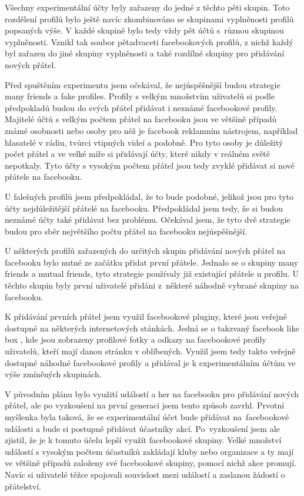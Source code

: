 \documentclass[thesis=M,czech]{FITthesis}[2013/05/10]
\begin{document}
Všechny experimentální účty byly zařazeny do jedné z těchto pěti skupin. Toto rozdělení profilů bylo ještě navíc zkombinováno se skupinami vyplněnosti profilů popsaných výše. V každé skupině bylo tedy vždy pět účtů s~různou skupinou vyplněnosti. Vznikl tak soubor pětadvaceti facebookových profilů, z nichž každý byl zařazen do jiné skupiny vyplněnosti a také rozdílné skupiny pro přidávání nových přátel.

Před spuštěním experimentu jsem očekával, že nejúspěšnější budou strategie many friends a fake profiles. Profily s velkým množstvím uživatelů si podle předpokladů budou do svých přátel přidávat i neznámé facebookové profily. Majitelé účtů s velkým počtem přátel na facebooku jsou ve většině případů známé osobnosti nebo osoby pro něž je facebook reklamním nástrojem, například hlasatelé v rádiu, tvůrci vtipných videí a podobně. Pro tyto osoby je důležitý počet přátel a ve velké míře si přidávají účty, které nikdy v reálném světě nepotkaly. Tyto účty s vysokým počtem přátel jsou tedy zvyklé přidávat si nové přátele na facebooku.

U falešných profilů jsem předpokládal, že to bude podobné, jelikož jsou pro tyto účty nejdůležitější přátelé na facebooku. Předpokládal jsem tedy, že si budou neznámé účty také přidávat bez problému. Očekával jsem, že tyto dvě strategie budou pro sběr největšího počtu přátel na facebooku nejúspěšnější.

U některých profilů zařazených do určitých skupin přidávání nových přátel na facebooku bylo nutné ze začátku přidat první přátele. Jednalo se o skupiny many friends a mutual friends, tyto strategie používaly již existující přátele u profilu. U těchto skupin byly první uživatelé přidáni z~některé náhodně vybrané skupiny na facebooku. 

K přidávání prvních přátel jsem využil facebookové pluginy, které jsou veřejně dostupné na některých internetových stánkách. Jedná se o takzvaný facebook like box \cite{web:fbLikeBox}, kde jsou zobrazeny profilové fotky a odkazy na facebookové profily uživatelů, kteří mají danou stránku v oblíbených. Využil jsem tedy takto veřejně dostupné náhodné facebookové profily a přidával je k experimentálním účtům ve výše zmíněných skupinách.

V původním plánu bylo využití událostí a her na facebooku pro přidávání nových přátel, ale po vyzkoušení na první generaci jsem tento způsob zavrhl. Prvotní myšlenka byla taková, že se experimentální účet bude přidávat na~facebookové události a bude si postupně přidávat účastníky akcí. Po~vyzkoušení jsem ale zjistil, že je k tomuto účelu lepší využít facebookové skupiny. Velké množství událostí s vysokým počtem účastníků zakládají kluby nebo organizace a ty mají ve většině případů založeny své facebookové skupiny, pomocí nichž akce promují. Navíc si uživatelé těžce spojovali souvislost mezi událostí a zaslanou žádostí o přátelství.
\end{document}
